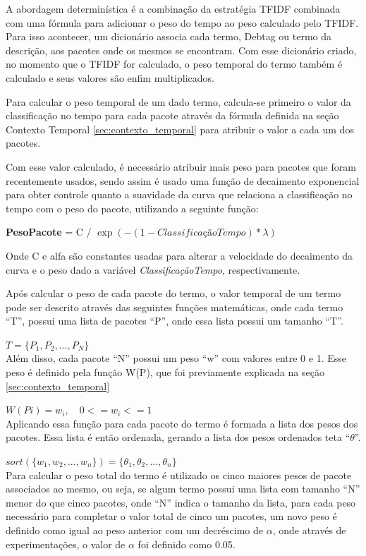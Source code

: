 A abordagem determinística é a combinação da estratégia TFIDF combinada com
uma fórmula para adicionar o peso do tempo ao peso calculado pelo TFIDF. Para
isso acontecer, um dicionário associa cada termo, Debtag ou termo da
descrição, aos pacotes onde os mesmos se encontram. Com esse dicionário criado,
no momento que o TFIDF for calculado, o peso temporal do termo também é
calculado e seus valores são enfim multiplicados.

Para calcular o peso temporal de um dado termo, calcula-se primeiro o valor da
classificação no tempo para cada pacote através da fórmula definida na seção
Contexto Temporal \ref{sec:contexto_temporal} para atribuir o valor
a cada um dos pacotes.

Com esse valor calculado, é necessário atribuir mais peso para pacotes que
foram recentemente usados, sendo assim é usado uma função de decaimento
exponencial para obter controle quanto a suavidade da curva que relaciona
a classificação no tempo com o peso do pacote, utilizando a seguinte função:

\textbf{PesoPacote} = C / $\exp\left(-({1 - ClassificaçãoTempo}) * {\lambda}\right)$

Onde C e alfa são constantes usadas para alterar a velocidade do decaimento da
curva e o peso dado a variável \textit{ClassificaçãoTempo}, respectivamente.

Após calcular o peso de cada pacote do termo, o valor temporal de um termo pode ser
descrito através das seguintes funções matemáticas, onde cada termo ``T'', possui uma
lista de pacotes ``P'', onde essa lista possui um tamanho ``T''.

$T = \{P_1, P_2, ..., P_N\}$
\\

Além disso, cada pacote ``N'' possui um peso ``w'' com valores entre 0 e 1. Esse peso
é definido pela função W(P), que foi previamente explicada na seção
\ref{sec:contexto_temporal}

$W(Pi) = w_i , \quad 0 <= w_i <= 1$
\\

Aplicando essa função para cada pacote do termo é formada a lista dos pesos
dos pacotes. Essa lista é então ordenada, gerando a lista
dos pesos ordenados teta ``$\theta$''.

$sort(\{w_1, w_2, ..., w_n\}) = \{\theta_1, \theta_2, ..., \theta_n\}$
\\

Para calcular o peso total do termo é utilizado os cinco maiores pesos de pacote
associados ao mesmo, ou seja, se algum termo possui uma lista com tamanho ``N''
menor do que cinco pacotes, onde ``N'' indica o tamanho da lista, para cada peso
necessário para completar o valor total de cinco um pacotes, um novo peso
é definido como igual ao peso anterior com um decréscimo de $\alpha$, onde
através de experimentações, o valor de $\alpha$ foi definido como 0.05.

